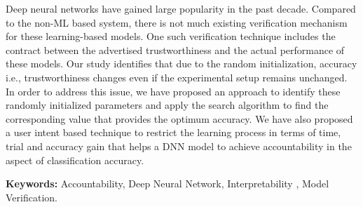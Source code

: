 Deep neural networks have gained large popularity in the past decade. Compared to the non-ML based system, there is not much existing verification mechanism for these learning-based models. One such verification technique includes the contract between the advertised trustworthiness and the actual performance of these models. Our study identifies that due to the random initialization, accuracy i.e., trustworthiness changes even if the experimental setup remains unchanged. In order to address this issue, we have proposed an approach to identify these randomly initialized parameters and apply the search algorithm to find the corresponding value that provides the optimum accuracy.
We have also proposed a user intent based technique to restrict the learning process in terms of time, trial and accuracy gain that helps a DNN model to achieve accountability in the aspect of classification accuracy.
 

\textbf{Keywords:} Accountability, Deep Neural Network, Interpretability , Model Verification.